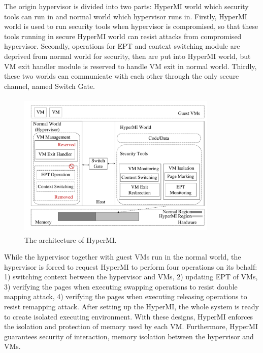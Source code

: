 \documentclass[conference]{IEEEtran}
\begin{document}
The origin hypervisor is divided into two parts: HyperMI world which security tools can run in and normal world which hypervisor runs in. Firstly, HyperMI world is used to run security tools when hypervisor is compromised, so that these tools running in secure HyperMI world can resist attacks from compromised hypervisor. Secondly, operations for EPT and context switching module are deprived from normal world for security, then are put into HyperMI world, but VM exit handler module is reserved to handle VM exit in normal world. Thirdly, these two worlds can communicate with each other through the only secure channel, named Switch Gate. 


\begin{figure}
\centerline{\includegraphics[width=9.5cm, height=7cm]{pdfvmcs1.pdf}}%
\caption{The architecture of HyperMI. } \label{fig1}
\end{figure}

While the hypervisor together with guest VMs run in the normal world, the hypervisor is forced to request HyperMI to perform four operations on its behalf: 1) switching context between the hypervisor and VMs, 2) updating EPT of VMs, 3) verifying the pages when executing swapping operations to resist double mapping attack, 4) verifying the pages when executing releasing operations to resist remapping attack. After setting up the HyperMI, the whole system is ready to create isolated executing environment. With these designs, HyperMI enforces the isolation and protection of memory used by each VM. Furthermore, HyperMI guarantees security of interaction, memory isolation between the hypervisor and VMs.
\end{document}
